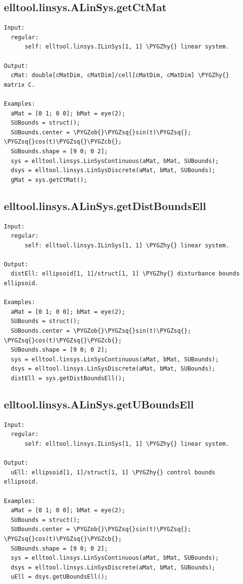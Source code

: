 \documentclass[letterpaper,10pt,english]{sphinxmanual}
\def\PYGZob{\char`\{}
\def\PYGZcb{\char`\}}
\def\PYGZhy{\char`\-}
\def\PYGZsq{\char`\'}
\begin{document}
\subsection{elltool.linsys.ALinSys.getCtMat}
\label{chap_functions:elltool-linsys-alinsys-getctmat}
\begin{Verbatim}[commandchars=\\\{\}]
Input:
  regular:
      self: elltool.linsys.ILinSys[1, 1] \PYGZhy{} linear system.

Output:
  cMat: double[cMatDim, cMatDim]/cell[cMatDim, cMatDim] \PYGZhy{} matrix C.

Examples:
  aMat = [0 1; 0 0]; bMat = eye(2);
  SUBounds = struct();
  SUBounds.center = \PYGZob{}\PYGZsq{}sin(t)\PYGZsq{}; \PYGZsq{}cos(t)\PYGZsq{}\PYGZcb{};
  SUBounds.shape = [9 0; 0 2];
  sys = elltool.linsys.LinSysContinuous(aMat, bMat, SUBounds);
  dsys = elltool.linsys.LinSysDiscrete(aMat, bMat, SUBounds);
  gMat = sys.getCtMat();
\end{Verbatim}


\subsection{elltool.linsys.ALinSys.getDistBoundsEll}
\label{chap_functions:elltool-linsys-alinsys-getdistboundsell}
\begin{Verbatim}[commandchars=\\\{\}]
Input:
  regular:
      self: elltool.linsys.ILinSys[1, 1] \PYGZhy{} linear system.

Output:
  distEll: ellipsoid[1, 1]/struct[1, 1] \PYGZhy{} disturbance bounds ellipsoid.

Examples:
  aMat = [0 1; 0 0]; bMat = eye(2);
  SUBounds = struct();
  SUBounds.center = \PYGZob{}\PYGZsq{}sin(t)\PYGZsq{}; \PYGZsq{}cos(t)\PYGZsq{}\PYGZcb{};
  SUBounds.shape = [9 0; 0 2];
  sys = elltool.linsys.LinSysContinuous(aMat, bMat, SUBounds);
  dsys = elltool.linsys.LinSysDiscrete(aMat, bMat, SUBounds);
  distEll = sys.getDistBoundsEll();
\end{Verbatim}


\subsection{elltool.linsys.ALinSys.getUBoundsEll}
\label{chap_functions:elltool-linsys-alinsys-getuboundsell}
\begin{Verbatim}[commandchars=\\\{\}]
Input:
  regular:
      self: elltool.linsys.ILinSys[1, 1] \PYGZhy{} linear system.

Output:
  uEll: ellipsoid[1, 1]/struct[1, 1] \PYGZhy{} control bounds ellipsoid.

Examples:
  aMat = [0 1; 0 0]; bMat = eye(2);
  SUBounds = struct();
  SUBounds.center = \PYGZob{}\PYGZsq{}sin(t)\PYGZsq{}; \PYGZsq{}cos(t)\PYGZsq{}\PYGZcb{};
  SUBounds.shape = [9 0; 0 2];
  sys = elltool.linsys.LinSysContinuous(aMat, bMat, SUBounds);
  dsys = elltool.linsys.LinSysDiscrete(aMat, bMat, SUBounds);
  uEll = dsys.getUBoundsEll();
\end{Verbatim}
\end{document}
